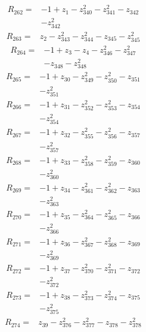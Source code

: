 \begin{align*}
R_{262}={}&-1+z_{1}-z_{340}^{2}-z_{341}^{2}-z_{342}\\
&-z_{342}^{2}
\end{align*}
\begin{align*}
R_{263}={}&z_{2}-z_{343}^{2}-z_{344}^{2}-z_{345}-z_{345}^{2}
\end{align*}
\begin{align*}
R_{264}={}&-1+z_{3}-z_{4}-z_{346}^{2}-z_{347}^{2}\\
&-z_{348}-z_{348}^{2}
\end{align*}
\begin{align*}
R_{265}={}&-1+z_{30}-z_{349}^{2}-z_{350}^{2}-z_{351}\\
&-z_{351}^{2}
\end{align*}
\begin{align*}
R_{266}={}&-1+z_{31}-z_{352}^{2}-z_{353}^{2}-z_{354}\\
&-z_{354}^{2}
\end{align*}
\begin{align*}
R_{267}={}&-1+z_{32}-z_{355}^{2}-z_{356}^{2}-z_{357}\\
&-z_{357}^{2}
\end{align*}
\begin{align*}
R_{268}={}&-1+z_{33}-z_{358}^{2}-z_{359}^{2}-z_{360}\\
&-z_{360}^{2}
\end{align*}
\begin{align*}
R_{269}={}&-1+z_{34}-z_{361}^{2}-z_{362}^{2}-z_{363}\\
&-z_{363}^{2}
\end{align*}
\begin{align*}
R_{270}={}&-1+z_{35}-z_{364}^{2}-z_{365}^{2}-z_{366}\\
&-z_{366}^{2}
\end{align*}
\begin{align*}
R_{271}={}&-1+z_{36}-z_{367}^{2}-z_{368}^{2}-z_{369}\\
&-z_{369}^{2}
\end{align*}
\begin{align*}
R_{272}={}&-1+z_{37}-z_{370}^{2}-z_{371}^{2}-z_{372}\\
&-z_{372}^{2}
\end{align*}
\begin{align*}
R_{273}={}&-1+z_{38}-z_{373}^{2}-z_{374}^{2}-z_{375}\\
&-z_{375}^{2}
\end{align*}
\begin{align*}
R_{274}={}&z_{39}-z_{376}^{2}-z_{377}^{2}-z_{378}-z_{378}^{2}
\end{align*}

